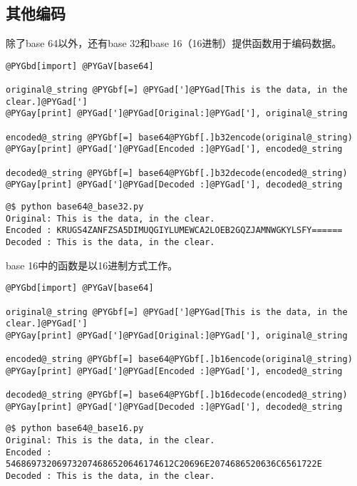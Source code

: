 \documentclass[letterpaper,10pt,english]{manual}
\begin{document}
\subsection{其他编码}

除了base 64以外，还有base 32和base 16（16进制）提供函数用于编码数据。

\begin{Verbatim}[commandchars=@\[\]]
@PYGbd[import] @PYGaV[base64]

original@_string @PYGbf[=] @PYGad[']@PYGad[This is the data, in the clear.]@PYGad[']
@PYGay[print] @PYGad[']@PYGad[Original:]@PYGad['], original@_string

encoded@_string @PYGbf[=] base64@PYGbf[.]b32encode(original@_string)
@PYGay[print] @PYGad[']@PYGad[Encoded :]@PYGad['], encoded@_string

decoded@_string @PYGbf[=] base64@PYGbf[.]b32decode(encoded@_string)
@PYGay[print] @PYGad[']@PYGad[Decoded :]@PYGad['], decoded@_string
\end{Verbatim}

\begin{Verbatim}[commandchars=@\[\]]
@$ python base64@_base32.py
Original: This is the data, in the clear.
Encoded : KRUGS4ZANFZSA5DIMUQGIYLUMEWCA2LOEB2GQZJAMNWGKYLSFY======
Decoded : This is the data, in the clear.
\end{Verbatim}

base 16中的函数是以16进制方式工作。

\begin{Verbatim}[commandchars=@\[\]]
@PYGbd[import] @PYGaV[base64]

original@_string @PYGbf[=] @PYGad[']@PYGad[This is the data, in the clear.]@PYGad[']
@PYGay[print] @PYGad[']@PYGad[Original:]@PYGad['], original@_string

encoded@_string @PYGbf[=] base64@PYGbf[.]b16encode(original@_string)
@PYGay[print] @PYGad[']@PYGad[Encoded :]@PYGad['], encoded@_string

decoded@_string @PYGbf[=] base64@PYGbf[.]b16decode(encoded@_string)
@PYGay[print] @PYGad[']@PYGad[Decoded :]@PYGad['], decoded@_string
\end{Verbatim}

\begin{Verbatim}[commandchars=@\[\]]
@$ python base64@_base16.py
Original: This is the data, in the clear.
Encoded : 546869732069732074686520646174612C20696E2074686520636C6561722E
Decoded : This is the data, in the clear.
\end{Verbatim}
\end{document}
